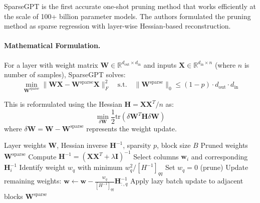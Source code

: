 SparseGPT \cite{frantar2023sparsegpt} is the first accurate one-shot pruning method that works efficiently at the scale of 100+ billion parameter models. The authors formulated the pruning method as sparse regression with layer-wise Hessian-based reconstruction.

\paragraph{Mathematical Formulation.}
For a layer with weight matrix $\mathbf{W} \in \mathbb{R}^{d_{\text{out}} \times d_{\text{in}}}$ and inputs $\mathbf{X} \in \mathbb{R}^{d_{\text{in}} \times n}$ (where $n$ is number of samples), SparseGPT solves:
\begin{equation}
	\min_{\mathbf{W}^{\text{sparse}}} \|\mathbf{W}\mathbf{X} - \mathbf{W}^{\text{sparse}}\mathbf{X}\|_F^2 \quad \text{s.t.} \quad \|\mathbf{W}^{\text{sparse}}\|_0 \leq (1-p) \cdot d_{\text{out}} \cdot d_{\text{in}}
\end{equation}

This is reformulated using the Hessian $\mathbf{H} = \mathbf{X}\mathbf{X}^T / n$ as:
\begin{equation}
	\min_{\delta \mathbf{W}} \frac{1}{2} \text{tr}(\delta \mathbf{W}^T \mathbf{H} \delta \mathbf{W})
\end{equation}
where $\delta \mathbf{W} = \mathbf{W} - \mathbf{W}^{\text{sparse}}$ represents the weight update.


\begin{algorithm}[H]
	\caption{SparseGPT}
	\begin{algorithmic}[1]
		\Require Layer weights $\mathbf{W}$, Hessian inverse $\mathbf{H}^{-1}$, sparsity $p$, block size $B$
		\Ensure Pruned weights $\mathbf{W}^{\text{sparse}}$
		\State Compute $\mathbf{H}^{-1} = (\mathbf{X}\mathbf{X}^T + \lambda \mathbf{I})^{-1}$
		\State Select columns $\mathbf{w}_i$ and corresponding $\mathbf{H}^{-1}_i$
		\State Identify weight $w_q$ with minimum $w_q^2 / [H^{-1}]_{qq}$
		\State Set $w_q = 0$ (prune)
		\State Update remaining weights: $\mathbf{w} \gets \mathbf{w} - \frac{w_q}{[H^{-1}]_{qq}} \mathbf{H}^{-1}_{:,q}$
		\EndFor
		\State Apply lazy batch update to adjacent blocks
		\EndFor
		\State \Return $\mathbf{W}^{\text{sparse}}$
	\end{algorithmic}
\end{algorithm}

